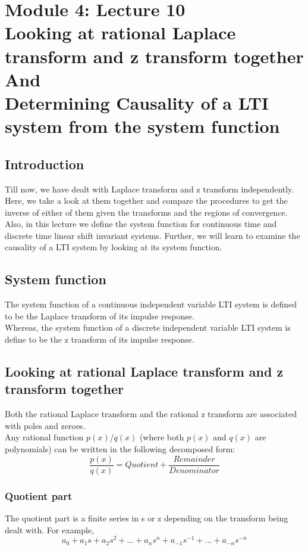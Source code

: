 \section{Module 4: Lecture 10\\Looking at rational Laplace transform and z transform together\\And\\Determining Causality of a LTI system from the system function}

\subsection{Introduction}
Till now, we have dealt with Laplace transform and z transform independently. Here, we take a look at them together and compare the procedures to get the inverse of either of them given the transforms and the regions of convergence. \\
Also, in this lecture we define the system function for continuous time and discrete time linear shift invariant systems. Further, we will learn to examine the causality of a LTI system by looking at its system function.
\subsection{System function}
The system function of a continuous independent variable LTI system is defined to be the Laplace transform of its impulse response. \\
Whereas, the system function of a discrete independent variable LTI system is define to be the z transform of its impulse response. \\
\subsection{Looking at rational Laplace transform and z transform together}
Both the rational Laplace transform and the rational z transform are associated with poles and zeroes. \\
Any rational function $p(x)/q(x)$ (where both $p(x)$ and $q(x)$ are polynomials) can be written in the following decomposed form:
\[ \frac{p(x)}{q(x)} = Quotient  +  \frac{Remainder}{Denominator} \]
\subsubsection{Quotient part}
The quotient part is a finite series in s or z depending on the transform being dealt with. For example, \\
\[ a_0 + a_1s + a_2s^2+ ... + a_ns^n + a_{-1}s^{-1} + ... + a_{-n}s^{-n} \]
